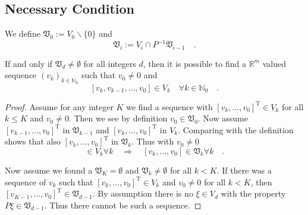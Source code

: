 \clearpage
\subsection{Necessary Condition}

\begin{definition}{}{}
	We define $\mathfrak{V}_0 := V_0\backslash \{0\}$ and
	\begin{equation}
	\mathfrak{V}_i := V_i \cap P^{-1}\mathfrak{V}_{i-1} \quad .
	\end{equation}
\end{definition}

\begin{lemma}{}{}
	If and only if $\mathfrak{V}_d \neq \emptyset $ for all integers $d$, then it is possible to 
	find a $\mathbb{R}^m$ valued sequence $(v_k)_{k\in\mathbb{N}_0}$ such that $v_0\neq 0$ and
	\begin{equation}
	\left[ v_k,v_{k-1},\ldots,v_0 \right] \in V_k 
	\quad \forall k\in\mathbb{N}_0 \quad .
	\end{equation}
\end{lemma}
\begin{proof}

	Assume for any integer $K$ we find a sequence with $[v_k,\ldots,v_0]^\text{T}\in V_k$ for all $k\leq K$ and 
	$v_0\neq 0$. Then 
	we see by definition $v_0\in \mathfrak{V}_0$. Now assume $[v_{k-1},\ldots,v_0]^\text{T}$ 
	in $\mathfrak{V}_{k-1}$ and $[v_k,\ldots,v_0]^\text{T}$ in $V_k$. Comparing with the definition shows 
	that also 
	$[v_k,\ldots,v_0]^\text{T}$ in $\mathfrak{V}_k$. Thus with $v_0\neq 0$
	\begin{equation}
	[v_k,\ldots,v_0]\in V_k \forall k \quad \Rightarrow \quad [v_k,\ldots,v_0]\in \mathfrak{V}_k
	\forall k \quad .
	\end{equation}
	
	Now assume we found a $\mathfrak{V}_K = \emptyset$ and $\mathfrak{V}_k \neq \emptyset$ for all $k<K$. 
	If there was a sequence of $v_k$ such that $[v_k,\ldots,v_0]^\text{T}\in V_k$ and $v_0\neq 0$ for all $k<K$,
	then \\$[v_{K-1},\ldots,v_0]^\text{T}\in\mathfrak{V}_{d-1}$. By assumption there is no $\xi\in V_d$ 
	with the property $P\xi \in\mathfrak{V}_{d-1}$. Thus there cannot be such a sequence. 
\end{proof}

